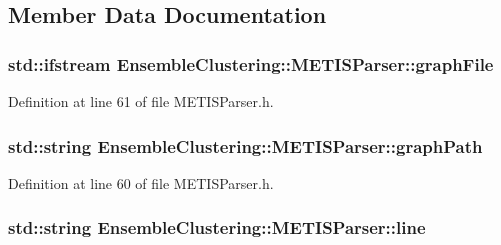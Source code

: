 \subsection{Member Data Documentation}
\hypertarget{class_ensemble_clustering_1_1_m_e_t_i_s_parser_abe77511f89d17b6a043d38790b334151}{
\subsubsection[{graph\-File}]{\setlength{\rightskip}{0pt plus 5cm}std\-::ifstream Ensemble\-Clustering\-::\-M\-E\-T\-I\-S\-Parser\-::graph\-File\hspace{0.3cm}{\ttfamily [protected]}}}\label{class_ensemble_clustering_1_1_m_e_t_i_s_parser_abe77511f89d17b6a043d38790b334151}


Definition at line 61 of file M\-E\-T\-I\-S\-Parser.\-h.

\hypertarget{class_ensemble_clustering_1_1_m_e_t_i_s_parser_a115b663b7cba22ec147d48f02c550b4a}{
\subsubsection[{graph\-Path}]{\setlength{\rightskip}{0pt plus 5cm}std\-::string Ensemble\-Clustering\-::\-M\-E\-T\-I\-S\-Parser\-::graph\-Path\hspace{0.3cm}{\ttfamily [protected]}}}\label{class_ensemble_clustering_1_1_m_e_t_i_s_parser_a115b663b7cba22ec147d48f02c550b4a}


Definition at line 60 of file M\-E\-T\-I\-S\-Parser.\-h.

\hypertarget{class_ensemble_clustering_1_1_m_e_t_i_s_parser_ac9ae7379afb81dde47ba1298c42a9273}{
\subsubsection[{line}]{\setlength{\rightskip}{0pt plus 5cm}std\-::string Ensemble\-Clustering\-::\-M\-E\-T\-I\-S\-Parser\-::line\hspace{0.3cm}{\ttfamily [protected]}}}\label{class_ensemble_clustering_1_1_m_e_t_i_s_parser_ac9ae7379afb81dde47ba1298c42a9273}


